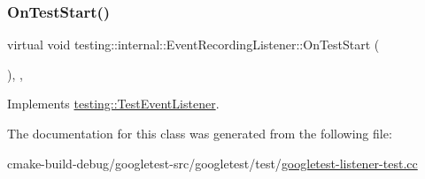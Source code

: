 \subsubsection{\texorpdfstring{OnTestStart()}{OnTestStart()}}
{\footnotesize\ttfamily virtual void testing\+::internal\+::\+Event\+Recording\+Listener\+::\+On\+Test\+Start (\begin{DoxyParamCaption}\item[{const \mbox{\hyperlink{classtesting_1_1TestInfo}{Test\+Info}} \&}]{ }\end{DoxyParamCaption})\hspace{0.3cm}{\ttfamily [inline]}, {\ttfamily [protected]}, {\ttfamily [virtual]}}



Implements \mbox{\hyperlink{classtesting_1_1TestEventListener_ab4f6a0ca16ae75daf385b3b5914e1048}{testing\+::\+Test\+Event\+Listener}}.



The documentation for this class was generated from the following file\+:\begin{DoxyCompactItemize}
\item 
cmake-\/build-\/debug/googletest-\/src/googletest/test/\mbox{\hyperlink{googletest-listener-test_8cc}{googletest-\/listener-\/test.\+cc}}\end{DoxyCompactItemize}
